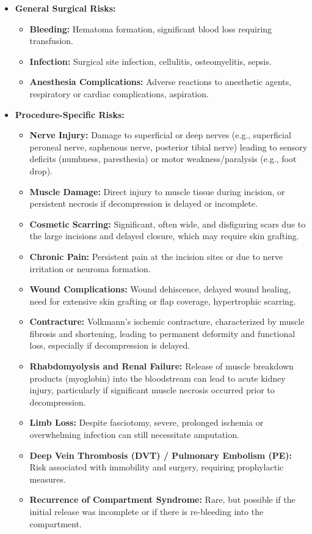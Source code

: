 \begin{itemize}
  \item \textbf{General Surgical Risks:}
    \begin{itemize}
      \item \textbf{Bleeding:} Hematoma formation, significant blood loss requiring transfusion.
      \item \textbf{Infection:} Surgical site infection, cellulitis, osteomyelitis, sepsis.
      \item \textbf{Anesthesia Complications:} Adverse reactions to anesthetic agents, respiratory or cardiac complications, aspiration.
    \end{itemize}
  \item \textbf{Procedure-Specific Risks:}
    \begin{itemize}
      \item \textbf{Nerve Injury:} Damage to superficial or deep nerves (e.g., superficial peroneal nerve, saphenous nerve, posterior tibial nerve) leading to sensory deficits (numbness, paresthesia) or motor weakness/paralysis (e.g., foot drop).
      \item \textbf{Muscle Damage:} Direct injury to muscle tissue during incision, or persistent necrosis if decompression is delayed or incomplete.
      \item \textbf{Cosmetic Scarring:} Significant, often wide, and disfiguring scars due to the large incisions and delayed closure, which may require skin grafting.
      \item \textbf{Chronic Pain:} Persistent pain at the incision sites or due to nerve irritation or neuroma formation.
      \item \textbf{Wound Complications:} Wound dehiscence, delayed wound healing, need for extensive skin grafting or flap coverage, hypertrophic scarring.
      \item \textbf{Contracture:} Volkmann's ischemic contracture, characterized by muscle fibrosis and shortening, leading to permanent deformity and functional loss, especially if decompression is delayed.
      \item \textbf{Rhabdomyolysis and Renal Failure:} Release of muscle breakdown products (myoglobin) into the bloodstream can lead to acute kidney injury, particularly if significant muscle necrosis occurred prior to decompression.
      \item \textbf{Limb Loss:} Despite fasciotomy, severe, prolonged ischemia or overwhelming infection can still necessitate amputation.
      \item \textbf{Deep Vein Thrombosis (DVT) / Pulmonary Embolism (PE):} Risk associated with immobility and surgery, requiring prophylactic measures.
      \item \textbf{Recurrence of Compartment Syndrome:} Rare, but possible if the initial release was incomplete or if there is re-bleeding into the compartment.
    \end{itemize}
\end{itemize}

